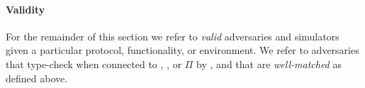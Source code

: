 \paragraph{Validity}
For the remainder of this section we refer to \emph{valid} adversaries and simulators given a particular protocol, functionality, or environment.
We refer to adversaries that type-check when connected to \Z, \F, or $\Pi$ by , and that are \emph{well-matched} as defined above. 



